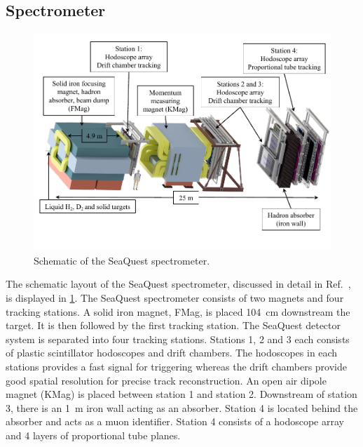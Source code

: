 \documentclass[reprint,aps,unsortedaddress,superscriptaddress,prc,floatfix,showpacs,linenumbers]{revtex4-2}
\begin{document}
\subsection{Spectrometer}
\begin{figure}
	\centering
	\includegraphics[width=0.8\linewidth]{spectrometer/twoColumnSeaQuestSpectrometerNIM.pdf}
	\caption{Schematic of the SeaQuest spectrometer.}
	\label{fig:spectrometer}
\end{figure}
The schematic layout of the SeaQuest spectrometer, discussed in detail in Ref.~\cite{aidala2019},
is displayed in \cref{fig:spectrometer}.
The SeaQuest spectrometer consists of two magnets and four tracking stations.
A solid iron magnet,
FMag, is placed \SI{104}{\cm} downstream the target. It is then followed by
the first tracking station. The SeaQuest detector system is separated into four tracking stations.
Stations 1, 2 and 3 each consists of plastic scintillator hodoscopes and drift chambers.
The hodoscopes in each stations provides a fast signal for triggering whereas
the drift chambers provide good spatial resolution for precise track reconstruction.
An open air dipole magnet (KMag) is placed between station 1 and station 2.
Downstream of station 3, there is an \SI{1}{\meter} iron wall acting as an
absorber. Station 4 is located behind the  absorber and acts as a
muon identifier. Station 4 consists of a hodoscope array and 4 layers of
proportional tube planes.
\end{document}
